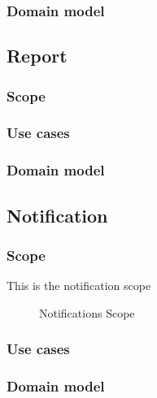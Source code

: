 \subsubsection{Domain model}
\subsection{Report}
\subsubsection{Scope}
\subsubsection{Use cases}
\subsubsection{Domain model}
\subsection{Notification}
\subsubsection{Scope}
This is the notification scope
	\begin{figure}[H]
	    	\centering
	    	\caption{Notifications Scope}
	    	\label{fig:Notification_Scope}
   	\end{figure}
\subsubsection{Use cases}
\subsubsection{Domain model}
